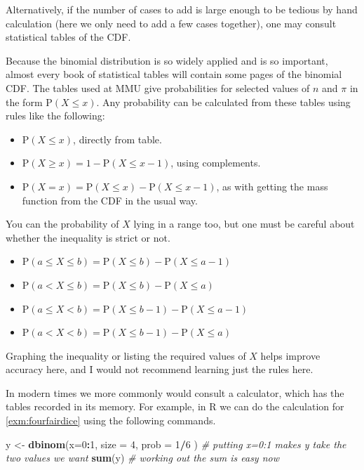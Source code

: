 \documentclass[
]{book}
\newenvironment{Shaded}{\begin{snugshade}}{\end{snugshade}}
\newcommand{\CommentTok}[1]{\textcolor[rgb]{0.56,0.35,0.01}{\textit{#1}}}
\newcommand{\DataTypeTok}[1]{\textcolor[rgb]{0.13,0.29,0.53}{#1}}
\newcommand{\DecValTok}[1]{\textcolor[rgb]{0.00,0.00,0.81}{#1}}
\newcommand{\KeywordTok}[1]{\textcolor[rgb]{0.13,0.29,0.53}{\textbf{#1}}}
\newcommand{\NormalTok}[1]{#1}
\newcommand{\OperatorTok}[1]{\textcolor[rgb]{0.81,0.36,0.00}{\textbf{#1}}}
\newcommand{\StringTok}[1]{\textcolor[rgb]{0.31,0.60,0.02}{#1}}
\theoremstyle{definition}
\theoremstyle{definition}
\theoremstyle{definition}
\theoremstyle{definition}
\theoremstyle{remark}
\begin{document}
Alternatively, if the number of cases to add is large enough to be tedious by hand calculation (here we only need to add a few cases together), one may consult statistical tables of the CDF.

Because the binomial distribution is so widely applied and is so important, almost every book of statistical tables will contain some pages of the binomial CDF. The tables used at MMU give probabilities for selected values of \(n\) and \(\pi\) in the form \(\text{P}(X\leq x)\). Any probability can be calculated from these tables using rules like the following:

\begin{itemize}
\item
  \(\text{P}(X\leq x)\), directly from table.
\item
  \(\text{P}(X\geq x) = 1- \text{P}(X\leq x-1)\), using complements.
\item
  \(\text{P}(X = x) = \text{P}(X\leq x) - \text{P}(X\leq x-1)\), as with getting the mass function from the CDF in the usual way.
\end{itemize}

You can the probability of \(X\) lying in a range too, but one must be careful about whether the inequality is strict or not.

\begin{itemize}
\item
  \(\text{P}(a\leq X\leq b) = \text{P}(X\leq b) - \text{P}(X\leq a-1)\)
\item
  \(\text{P}(a< X\leq b) = \text{P}(X\leq b) - \text{P}(X\leq a)\)
\item
  \(\text{P}(a\leq X < b) = \text{P}(X\leq b-1) - \text{P}(X\leq a-1)\)
\item
  \(\text{P}(a< X < b) = \text{P}(X\leq b-1) - \text{P}(X\leq a)\)
\end{itemize}

Graphing the inequality or listing the required values of \(X\) helps improve accuracy here, and I would not recommend learning just the rules here.

In modern times we more commonly would consult a calculator, which has the tables recorded in its memory. For example, in R we can do the calculation for \ref{exm:fourfairdice} using the following commands.

\begin{Shaded}
\begin{Highlighting}[]
\NormalTok{y <-}\StringTok{ }\KeywordTok{dbinom}\NormalTok{(}\DataTypeTok{x=}\DecValTok{0}\OperatorTok{:}\DecValTok{1}\NormalTok{, }\DataTypeTok{size =} \DecValTok{4}\NormalTok{, }\DataTypeTok{prob =} \DecValTok{1}\OperatorTok{/}\DecValTok{6}\NormalTok{ ) }\CommentTok{# putting x=0:1 makes y take the two values we want}
\KeywordTok{sum}\NormalTok{(y) }\CommentTok{# working out the sum is easy now}
\end{Highlighting}
\end{Shaded}
\end{document}
